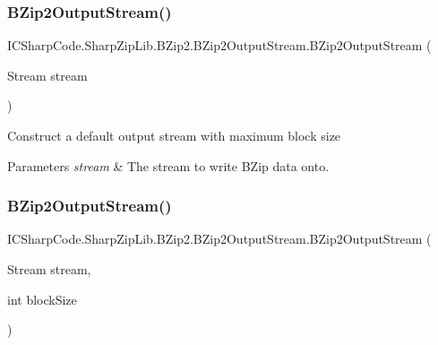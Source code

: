 \subsubsection{\texorpdfstring{B\+Zip2\+Output\+Stream()}{BZip2OutputStream()}\hspace{0.1cm}{\footnotesize\ttfamily [1/2]}}
{\footnotesize\ttfamily I\+C\+Sharp\+Code.\+Sharp\+Zip\+Lib.\+B\+Zip2.\+B\+Zip2\+Output\+Stream.\+B\+Zip2\+Output\+Stream (\begin{DoxyParamCaption}\item[{Stream}]{stream }\end{DoxyParamCaption})\hspace{0.3cm}{\ttfamily [inline]}}



Construct a default output stream with maximum block size 


\begin{DoxyParams}{Parameters}
{\em stream} & The stream to write B\+Zip data onto.\\
\hline
\end{DoxyParams}
\mbox{\label{class_i_c_sharp_code_1_1_sharp_zip_lib_1_1_b_zip2_1_1_b_zip2_output_stream_aa9034eb682b617126197ba4fa4280473}} 
\subsubsection{\texorpdfstring{B\+Zip2\+Output\+Stream()}{BZip2OutputStream()}\hspace{0.1cm}{\footnotesize\ttfamily [2/2]}}
{\footnotesize\ttfamily I\+C\+Sharp\+Code.\+Sharp\+Zip\+Lib.\+B\+Zip2.\+B\+Zip2\+Output\+Stream.\+B\+Zip2\+Output\+Stream (\begin{DoxyParamCaption}\item[{Stream}]{stream,  }\item[{int}]{block\+Size }\end{DoxyParamCaption})\hspace{0.3cm}{\ttfamily [inline]}}



